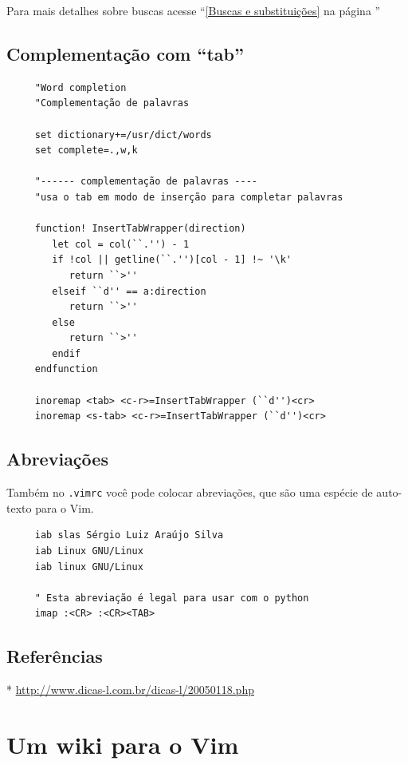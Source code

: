 \documentclass[10pt,a4paper,openany]{book}
\begin{document}
Para mais detalhes sobre buscas acesse ``\ref{Buscas e substituições}
na página \pageref{Buscas e substituições}''

\section{Complementação com ``tab''}\label{Complementação com ``tab''}

\begin{verbatim}
     "Word completion
     "Complementação de palavras
     
     set dictionary+=/usr/dict/words
     set complete=.,w,k
     
     "------ complementação de palavras ----
     "usa o tab em modo de inserção para completar palavras
     
     function! InsertTabWrapper(direction)
        let col = col(``.'') - 1
        if !col || getline(``.'')[col - 1] !~ '\k'
           return ``>''
        elseif ``d'' == a:direction
           return ``>''
        else
           return ``>''
        endif
     endfunction
     
     inoremap <tab> <c-r>=InsertTabWrapper (``d'')<cr>
     inoremap <s-tab> <c-r>=InsertTabWrapper (``d'')<cr>
\end{verbatim}

\section{Abreviações}\label{Abreviações}
Também no \verb|.vimrc| você pode colocar abreviações, que são uma espécie de
auto-texto para o Vim.

\begin{verbatim}
     iab slas Sérgio Luiz Araújo Silva
     iab Linux GNU/Linux
     iab linux GNU/Linux
     
     " Esta abreviação é legal para usar com o python
     imap :<CR> :<CR><TAB>
\end{verbatim}

\section{Referências}
\label{Referências}
* \url{http://www.dicas-l.com.br/dicas-l/20050118.php}

\chapter{Um wiki para o Vim}\label{cha:Um wiki para o Vim}
\end{document}
